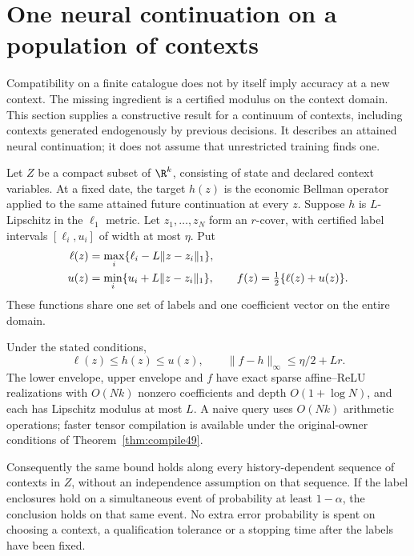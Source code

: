 \section{One neural continuation on a population of contexts}\label{sec:population86}
Compatibility on a finite catalogue does not by itself imply accuracy at a new context. The missing ingredient is a certified modulus on the context domain. This section supplies a constructive result for a continuum of contexts, including contexts generated endogenously by previous decisions. It describes an attained neural continuation; it does not assume that unrestricted training finds one.

Let $Z$ be a compact subset of $\R^k$, consisting of state and declared context variables. At a fixed date, the target $h(z)$ is the economic Bellman operator applied to the same attained future continuation at every $z$. Suppose $h$ is $L$-Lipschitz in the $\ell_1$ metric. Let $z_1,\ldots,z_N$ form an $r$-cover, with certified label intervals $[\ell_i,u_i]$ of width at most $\eta$. Put
\begin{align}\label{eq:shared-envelope86}
 \ell(z)&=\max_i\{\ell_i-L\|z-z_i\|_1\},\\
 u(z)&=\min_i\{u_i+L\|z-z_i\|_1\},\qquad
 f(z)=\tfrac12\{\ell(z)+u(z)\}.\notag
\end{align}
These functions share one set of labels and one coefficient vector on the entire domain.

\begin{theorem}\label{thm:population86}
Under the stated conditions,
\begin{equation}\label{eq:population86}
 \ell(z)\le h(z)\le u(z),\qquad
 \|f-h\|_\infty\le\eta/2+Lr.
\end{equation}
The lower envelope, upper envelope and $f$ have exact sparse affine--ReLU realizations with $O(Nk)$ nonzero coefficients and depth $O(1+\log N)$, and each has Lipschitz modulus at most $L$. A naive query uses $O(Nk)$ arithmetic operations; faster tensor compilation is available under the original-owner conditions of Theorem~\ref{thm:compile49}.

Consequently the same bound holds along every history-dependent sequence of contexts in $Z$, without an independence assumption on that sequence. If the label enclosures hold on a simultaneous event of probability at least $1-\alpha$, the conclusion holds on that same event. No extra error probability is spent on choosing a context, a qualification tolerance or a stopping time after the labels have been fixed.
\end{theorem}

